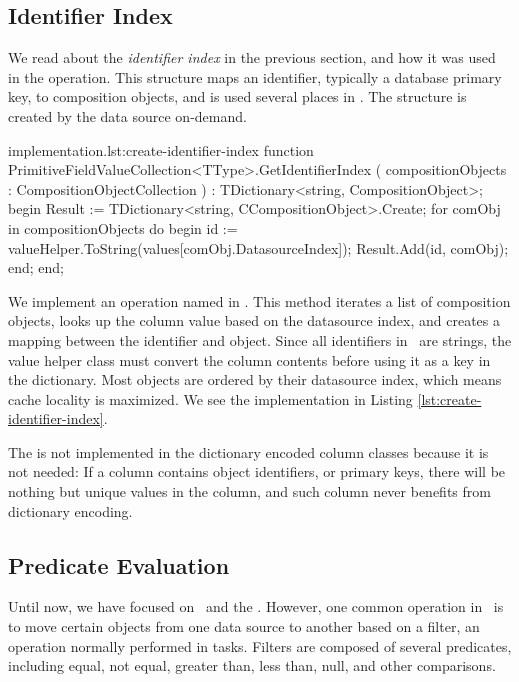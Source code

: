 \subsection{Identifier Index}
\label{sub:Identifier Index}
We read about the \textit{identifier index} in the previous section, and how it was used in the  operation. This structure maps an identifier, typically a database primary key, to composition objects, and is used several places in \gap. The structure is created by the data source on-demand.
\begin{delphicode}{ implementation.}{lst:create-identifier-index}
function PrimitiveFieldValueCollection<TType>.GetIdentifierIndex
( compositionObjects : CompositionObjectCollection )
: TDictionary<string, CompositionObject>;
begin
  Result := TDictionary<string, CCompositionObject>.Create;
  for comObj in compositionObjects do
  begin
    id := valueHelper.ToString(values[comObj.DatasourceIndex]);
    Result.Add(id, comObj);
  end;
end;
\end{delphicode}
We implement an operation named  in . This method iterates a list of composition objects, looks up the column value based on the datasource index, and creates a mapping between the identifier and object. Since all identifiers in \gap~are strings, the value helper class must convert the column contents before using it as a key in the dictionary. Most objects are ordered by their datasource index, which means cache locality is maximized. We see the  implementation in Listing \ref{lst:create-identifier-index}.

The  is not implemented in the dictionary encoded column classes because it is not needed: If a column contains object identifiers, or primary keys, there will be nothing but unique values in the column, and such column never benefits from dictionary encoding.

\subsection{Predicate Evaluation}
\label{sub:Predicate Evaluation}
Until now, we have focused on \gd~and the \tpchdl. However, one common operation in \gap~is to move certain objects from one data source to another based on a filter, an operation normally performed in tasks. Filters are composed of several predicates, including equal, not equal, greater than, less than, null, and other comparisons.

